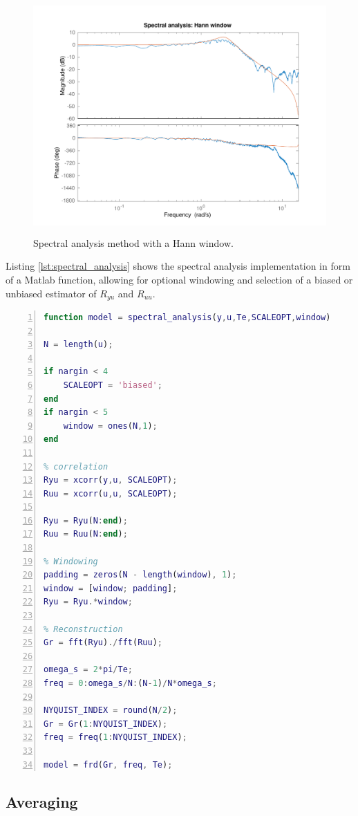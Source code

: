 \documentclass[a4paper,11pt]{article}
\begin{document}
\begin{figure}[H]
	\centering
    \includegraphics[height=9cm]{images/ce2_2_hann_window}
    \caption{Spectral analysis method with a Hann window.}
    \label{fig:bode_hann}
\end{figure}

Listing \ref{lst:spectral_analysis} shows the spectral analysis implementation in form of a Matlab function, allowing for optional windowing and selection of a biased or unbiased estimator of $R_{yu}$ and $R_{uu}$.

\begin{lstlisting}[language=Matlab,numbers=left,caption=spectral analysis,label=lst:spectral_analysis]
function model = spectral_analysis(y,u,Te,SCALEOPT,window)

N = length(u);

if nargin < 4
    SCALEOPT = 'biased';
end
if nargin < 5
    window = ones(N,1);
end

% correlation
Ryu = xcorr(y,u, SCALEOPT);
Ruu = xcorr(u,u, SCALEOPT);

Ryu = Ryu(N:end);
Ruu = Ruu(N:end);

% Windowing
padding = zeros(N - length(window), 1);
window = [window; padding];
Ryu = Ryu.*window;

% Reconstruction
Gr = fft(Ryu)./fft(Ruu);

omega_s = 2*pi/Te;
freq = 0:omega_s/N:(N-1)/N*omega_s;

NYQUIST_INDEX = round(N/2);
Gr = Gr(1:NYQUIST_INDEX);
freq = freq(1:NYQUIST_INDEX);

model = frd(Gr, freq, Te);
\end{lstlisting}

\subsection*{Averaging}
\end{document}
